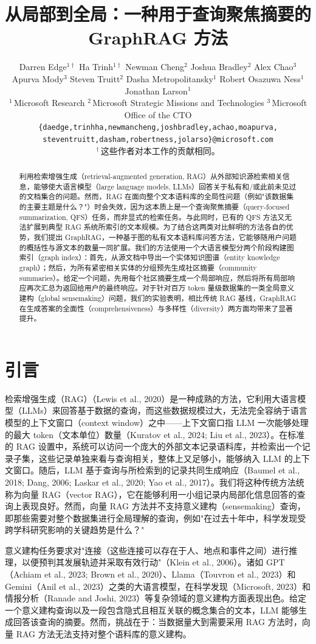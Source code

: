 \documentclass[11pt,UTF8,fontset=fandol]{ctexart}
\title{\textbf{从局部到全局：一种用于查询聚焦摘要的 GraphRAG 方法}}
\author{Darren Edge$^{1\dagger}$ \quad Ha Trinh$^{1\dagger}$ \quad Newman Cheng$^{2}$ \quad Joshua Bradley$^{2}$ \quad Alex Chao$^{3}$\\[2pt]
Apurva Mody$^{3}$ \quad Steven Truitt$^{2}$ \quad Dasha Metropolitansky$^{1}$ \quad Robert Osazuwa Ness$^{1}$\\[2pt]
Jonathan Larson$^{1}$\\[4pt]
$^{1}$\,Microsoft Research \quad $^{2}$\,Microsoft Strategic Missions and Technologies \quad $^{3}$\,Microsoft Office of the CTO\\[4pt]
\texttt{\{daedge,trinhha,newmancheng,joshbradley,achao,moapurva,}\\
\texttt{steventruitt,dasham,robertness,jolarso\}@microsoft.com}\\[4pt]
{\small $^{\dagger}$\,这些作者对本工作的贡献相同。}}
\date{}
\begin{document}
\maketitle

\begin{abstract}
利用检索增强生成（retrieval-augmented generation, RAG）从外部知识源检索相关信息，能够使大语言模型（large language models, LLMs）回答关于私有和/或此前未见过的文档集合的问题。然而，RAG 在面向整个文本语料库的全局性问题（例如"该数据集的主要主题是什么？"）时会失效，因为这本质上是一个查询聚焦摘要（query-focused summarization, QFS）任务，而非显式的检索任务。与此同时，已有的 QFS 方法又无法扩展到典型 RAG 系统所索引的文本规模。为了结合这两类对比鲜明的方法各自的优势，我们提出 GraphRAG，一种基于图的私有文本语料库问答方法，它能够随用户问题的概括性与源文本的数量一同扩展。我们的方法使用一个大语言模型分两个阶段构建图索引（graph index）：首先，从源文档中导出一个实体知识图谱（entity knowledge graph）；然后，为所有紧密相关实体的分组预先生成社区摘要（community summaries）。给定一个问题，先用每个社区摘要生成一个局部响应，然后将所有局部响应再次汇总为返回给用户的最终响应。对于针对百万 token 量级数据集的一类全局意义建构（global sensemaking）问题，我们的实验表明，相比传统 RAG 基线，GraphRAG 在生成答案的全面性（comprehensiveness）与多样性（diversity）两方面均带来了显著提升。
\end{abstract}

\section{引言}

检索增强生成（RAG）（Lewis et al., 2020）是一种成熟的方法，它利用大语言模型（LLMs）来回答基于数据的查询，而这些数据规模过大，无法完全容纳于语言模型的上下文窗口（context window）之中——上下文窗口指 LLM 一次能够处理的最大 token（文本单位）数量（Kuratov et al., 2024; Liu et al., 2023）。在标准的 RAG 设置中，系统可以访问一个庞大的外部文本记录语料库，并检索出一个记录子集，这些记录单独来看与查询相关，整体上又足够小，能够纳入 LLM 的上下文窗口。随后，LLM 基于查询与所检索到的记录共同生成响应（Baumel et al., 2018; Dang, 2006; Laskar et al., 2020; Yao et al., 2017）。我们将这种传统方法统称为向量 RAG（vector RAG），它在能够利用一小组记录内局部化信息回答的查询上表现良好。然而，向量 RAG 方法并不支持意义建构（sensemaking）查询，即那些需要对整个数据集进行全局理解的查询，例如"在过去十年中，科学发现受跨学科研究影响的关键趋势是什么？"

意义建构任务要求对"连接（这些连接可以存在于人、地点和事件之间）进行推理，以便预判其发展轨迹并采取有效行动"（Klein et al., 2006）。诸如 GPT（Achiam et al., 2023; Brown et al., 2020）、Llama（Touvron et al., 2023）和 Gemini（Anil et al., 2023）之类的大语言模型，在科学发现（Microsoft, 2023）和情报分析（Ranade and Joshi, 2023）等复杂领域的意义建构方面表现出色。给定一个意义建构查询以及一段包含隐式且相互关联的概念集合的文本，LLM 能够生成回答该查询的摘要。然而，挑战在于：当数据量大到需要采用 RAG 方法时，向量 RAG 方法无法支持对整个语料库的意义建构。
\end{document}
